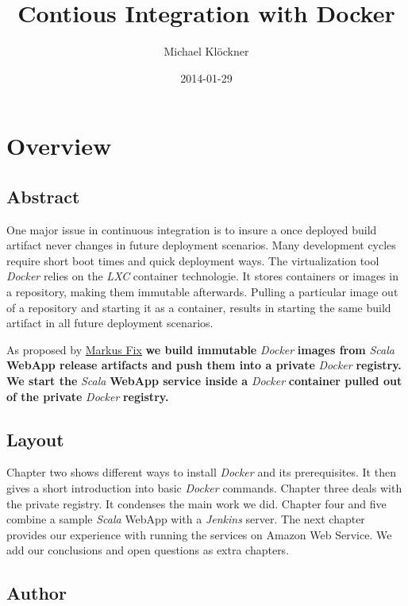 \documentclass[captions=tableheading]{article}
\title{Contious Integration with Docker}
\author{Michael Klöckner}
\date{2014-01-29}
\begin{document}
\maketitle

\setcounter{tocdepth}{2}
\tableofcontents
\vspace*{1cm}




\section{Overview}
\label{sec-1}
\subsection{Abstract}
\label{sec-1-1}

One major issue in continuous integration is to insure a once deployed build artifact never changes in future deployment scenarios. Many development cycles require short boot times and quick deployment ways. The virtualization tool \emph{Docker} relies on the \emph{LXC} container technologie. It stores containers or images in a repository, making them immutable afterwards. Pulling a particular image out of a repository and starting it as a container, results in starting the same build artifact in all future deployment scenarios. 

As proposed by \href{http://deeprecursion.com/}{Markus Fix} \textbf{we build immutable} \emph{Docker} \textbf{images  from} \emph{Scala} \textbf{WebApp release artifacts and push them into a private} \emph{Docker} \textbf{registry. We start the} \emph{Scala} \textbf{WebApp service inside a} \emph{Docker} \textbf{container pulled out of the private} \emph{Docker} \textbf{registry.} 
\subsection{Layout}
\label{sec-1-2}

Chapter two shows different ways to install \emph{Docker} and its prerequisites. It then gives a short introduction into basic \emph{Docker} commands. Chapter three deals with the private registry. It condenses the main work we did. Chapter four and five combine a sample \emph{Scala} WebApp with a \emph{Jenkins} server. The next chapter provides our experience with running the services on Amazon Web Service. We add our conclusions and open questions as extra chapters.  
\subsection{Author}
\label{sec-1-3}
\end{document}
